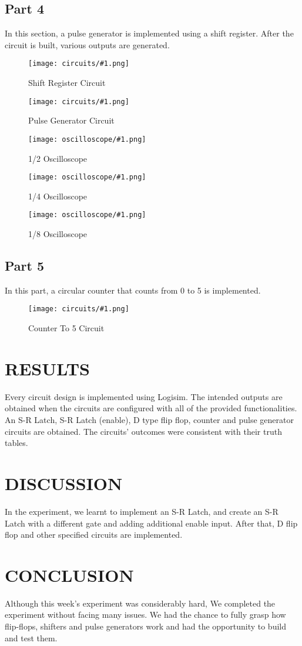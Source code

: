 \documentclass[pdftex,12pt,a4paper]{article}
\theoremstyle{plain}
\newcommand{\circuit}[1]{
    \begin{figure}[H]
    	\centering
    	\texttt{[image: circuits/\#1.png]}
    	\caption{#1 Circuit}
    	\label{fig7}
    \end{figure}
    \vspace{1cm}
}
\newcommand{\oscilloscope}[1]{
    \begin{figure}[H]
    	\centering
    	\texttt{[image: oscilloscope/\#1.png]}
    	\caption{1/#1 Oscilloscope}
    	\label{fig7}
    \end{figure}
    \vspace{1cm}
}
\begin{document}
    \subsection{Part 4}
        In this section, a pulse generator is implemented using a shift register. After the circuit is built, various outputs are generated.
        \circuit{Shift Register}
        \circuit{Pulse Generator}
        \oscilloscope{2}
        \oscilloscope{4}
        \oscilloscope{8}

    \newpage
    \subsection{Part 5}
        In this part, a circular counter that counts from 0 to 5 is implemented.
        \circuit{Counter To 5}
\section{RESULTS}
Every circuit design is implemented using Logisim. The intended outputs are obtained when the circuits are configured with all of the provided functionalities. An S-R Latch, S-R Latch (enable), D type flip flop, counter and pulse generator circuits are obtained. The circuits' outcomes were consistent with their truth tables.

\section{DISCUSSION}
In the experiment, we learnt to implement an S-R Latch, and create an S-R Latch with a different gate and adding additional enable input. After that, D flip flop and other specified circuits are implemented.
\section{CONCLUSION}
Although this week's experiment was considerably hard, We completed the experiment without facing many issues. We had the chance to fully grasp how flip-flops, shifters and pulse generators work and had the opportunity to build and test them.
\end{document}
